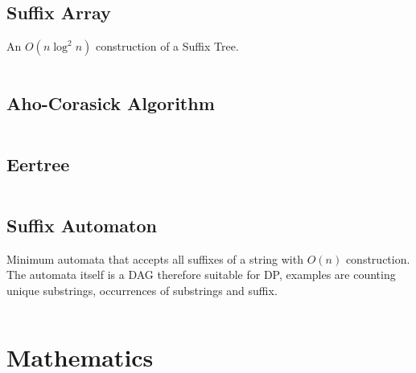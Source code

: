 \documentclass[9pt,a4paper,twocolumn,landscape,oneside]{amsart}
\newcommand{\code}[1]{\inputminted{cpp}{_code/#1}}
\newif\ifverbose
\begin{document}
    \ifverbose
    \subsection{Trie}
        A Trie class.
        \code{strings/trie.cpp}
    \fi

    \subsection{Suffix Array}
        An $O(n \log^2 n)$ construction of a Suffix Tree.
        \code{strings/suffix_array.cpp}

    \subsection{Aho-Corasick Algorithm}
        \ifverbose
        An implementation of the Aho-Corasick algorithm. Constructs a state
        machine from a set of keywords which can be used to search a string for
        any of the keywords.
        \fi
        \code{strings/aho_corasick.cpp}

    \subsection{Eertree}
        \ifverbose
        Constructs an Eertree in $O(n)$, one character at a time.
        \fi
        \code{strings/eertree.cpp}

    \subsection{Suffix Automaton}
        Minimum automata that accepts all suffixes of a string with $O(n)$
        construction. The automata itself is a DAG therefore suitable for DP,
        examples are counting unique substrings, occurrences of substrings and
        suffix.
        \code{strings/suffix_automaton.cpp}

\section{Mathematics}
    \ifverbose
    \subsection{Fraction}
        A fraction (rational number) class. Note that numbers are stored in
        lowest common terms.
        \code{mathematics/fraction.cpp}
    \fi
\end{document}
